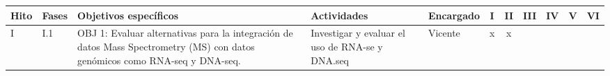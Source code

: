 \documentclass[a4paper,11pt]{article}
\begin{document}
	




\begin{table}[H]
	\scriptsize
	\begin{tabular}{p{0.6cm}p{0.6cm}p{6cm}p{4cm}p{1cm}cccccc} \\ \hline
		
		
		
		
		
		\textbf{Hito}        & \textbf{Fases}        & \textbf{Objetivos específicos}                                                                                                                                                                                                                                                             & \textbf{Actividades}                                                                                 & \textbf{Encargado} & \multicolumn{1}{c}{I} & \multicolumn{1}{c}{II} & III                  & IV                   & \multicolumn{1}{c}{V} & \multicolumn{1}{c}{VI} \\  \hline
		
		\multirow{17}{*}{I}  & \multirow{3}{*}{I.1}  & \multirow{3}{6cm}{OBJ 1: Evaluar alternativas para la integración de datos Mass Spectrometry (MS) con datos genómicos como RNA-seq y DNA-seq.}                                                                                                                                            & Investigar y evaluar el uso de RNA-se y DNA.seq                                                      & Vicente            & \multicolumn{1}{c}{x} & \multicolumn{1}{c}{x}  & \multicolumn{1}{l}{} & \multicolumn{1}{l}{} &                       &                        \\
		

\end{tabular}
\end{table}
\end{document}
